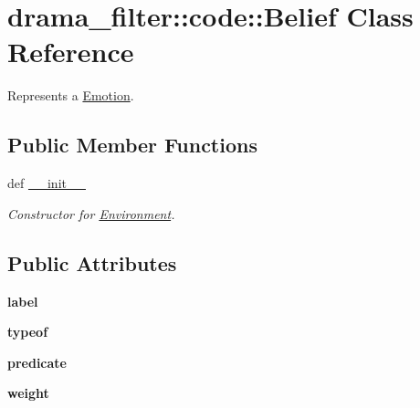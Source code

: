 \hypertarget{classdrama__filter_1_1code_1_1Belief}{
\section{drama\_\-filter::code::Belief Class Reference}
\label{classdrama__filter_1_1code_1_1Belief}
}


Represents a \hyperlink{classdrama__filter_1_1code_1_1Emotion}{Emotion}.  


\subsection*{Public Member Functions}
\begin{DoxyCompactItemize}
\item 
def \hyperlink{classdrama__filter_1_1code_1_1Belief_a5f1c4557d3add6e591ae25dae271f3ab}{\_\-\_\-init\_\-\_\-}
\begin{DoxyCompactList}\small\item\em Constructor for \hyperlink{classdrama__filter_1_1code_1_1Environment}{Environment}. \end{DoxyCompactList}\end{DoxyCompactItemize}
\subsection*{Public Attributes}
\begin{DoxyCompactItemize}
\item 
\hypertarget{classdrama__filter_1_1code_1_1Belief_abf667512d1138086d9c055646105562b}{
{\bfseries label}}
\label{classdrama__filter_1_1code_1_1Belief_abf667512d1138086d9c055646105562b}

\item 
\hypertarget{classdrama__filter_1_1code_1_1Belief_a3ff9d968521b8bc1bd9738aab4016368}{
{\bfseries typeof}}
\label{classdrama__filter_1_1code_1_1Belief_a3ff9d968521b8bc1bd9738aab4016368}

\item 
\hypertarget{classdrama__filter_1_1code_1_1Belief_a37083d086b994a453706f705d2fdb229}{
{\bfseries predicate}}
\label{classdrama__filter_1_1code_1_1Belief_a37083d086b994a453706f705d2fdb229}

\item 
\hypertarget{classdrama__filter_1_1code_1_1Belief_a272be6aac48a4c8115cb1d1ebcfb67bf}{
{\bfseries weight}}
\label{classdrama__filter_1_1code_1_1Belief_a272be6aac48a4c8115cb1d1ebcfb67bf}

\end{DoxyCompactItemize}


